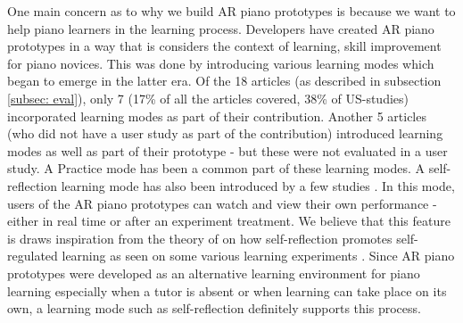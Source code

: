 \documentclass[sigchi, review]{acmart}
\begin{document}

One main concern as to why we build AR piano prototypes is because we want to help piano learners in the learning process. Developers have created AR piano prototypes in a way that is considers the context of learning, skill improvement for piano novices. This was done by introducing various learning modes which began to emerge in the latter era. Of the 18 articles (as described in subsection \ref{subsec: eval}), only 7 (17\% of all the articles covered, 38\% of US-studies) incorporated learning modes as part of their contribution. Another 5 articles (who did not have a user study as part of the contribution) introduced learning modes as well as part of their prototype - but these were not evaluated in a user study. A Practice mode has been a common part of these learning modes. A self-reflection learning mode has also been introduced by a few studies \cite{gerry2019adept, xu20195, xiao2013mirrorfugue}. In this mode, users of the AR piano prototypes can watch and view their own performance - either in real time or after an experiment treatment. We believe that this feature is draws inspiration from the theory of \citet{zimmerman2009self} on how self-reflection promotes self-regulated learning as seen on some various learning experiments \cite{deja2016discovering,lyons2011monitoring}. Since AR piano prototypes were developed as an alternative learning environment for piano learning especially when a tutor is absent or when learning can take place on its own, a learning mode such as self-reflection definitely supports this process. 
\end{document}
